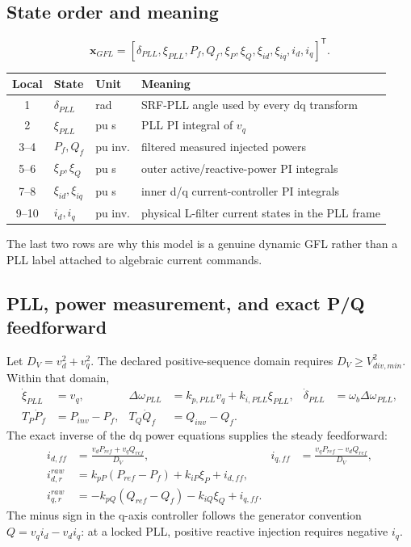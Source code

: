 \documentclass[12pt,a4paper]{article}
\newcommand{\vect}[1]{\boldsymbol{#1}}
\begin{document}
\subsection{State order and meaning}

\[
\vect x_{GFL}=[\delta_{PLL},\xi_{PLL},P_f,Q_f,\xi_P,\xi_Q,
\xi_{id},\xi_{iq},i_d,i_q]^{\mathsf T}.
\]
\begin{center}\small
\begin{tabularx}{\textwidth}{c l l X}
\toprule
Local & State & Unit & Meaning\\\midrule
1 & \(\delta_{PLL}\) & rad & SRF-PLL angle used by every dq transform\\
2 & \(\xi_{PLL}\) & pu s & PLL PI integral of \(v_q\)\\
3--4 & \(P_f,Q_f\) & pu inv. & filtered measured injected powers\\
5--6 & \(\xi_P,\xi_Q\) & pu s & outer active/reactive-power PI integrals\\
7--8 & \(\xi_{id},\xi_{iq}\) & pu s & inner d/q current-controller PI integrals\\
9--10 & \(i_d,i_q\) & pu inv. & physical L-filter current states in the PLL frame\\
\bottomrule
\end{tabularx}
\end{center}
The last two rows are why this model is a genuine dynamic GFL rather than a
PLL label attached to algebraic current commands.

\subsection{PLL, power measurement, and exact P/Q feedforward}

Let \(D_V=v_d^2+v_q^2\).  The declared positive-sequence domain requires
\(D_V\ge V_{div,min}^2\).  Within that domain,
\begin{align}
\dot\xi_{PLL}&=v_q,&
\Delta\omega_{PLL}&=k_{p,PLL}v_q+k_{i,PLL}\xi_{PLL},&
\dot\delta_{PLL}&=\omega_b\Delta\omega_{PLL},\\
T_P\dot P_f&=P_{inv}-P_f,&T_Q\dot Q_f&=Q_{inv}-Q_f.
\end{align}
The exact inverse of the dq power equations supplies the steady feedforward:
\begin{align}
i_{d,ff}&=\frac{v_dP_{ref}+v_qQ_{ref}}{D_V},&
i_{q,ff}&=\frac{v_qP_{ref}-v_dQ_{ref}}{D_V},\\
i_{d,r}^{raw}&=k_{pP}(P_{ref}-P_f)+k_{iP}\xi_P+i_{d,ff},\\
i_{q,r}^{raw}&=-k_{pQ}(Q_{ref}-Q_f)-k_{iQ}\xi_Q+i_{q,ff}.
\end{align}
The minus sign in the q-axis controller follows the generator convention
\(Q=v_qi_d-v_di_q\): at a locked PLL, positive reactive injection requires
negative \(i_q\).
\end{document}
